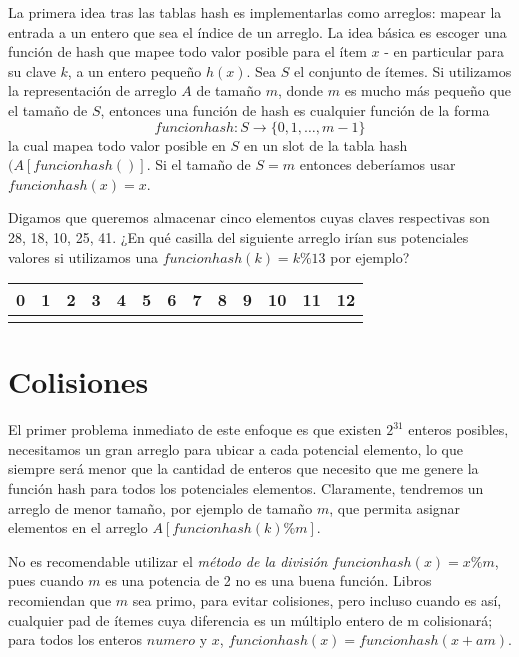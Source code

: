 La primera idea tras las tablas hash es implementarlas como arreglos: mapear la entrada a un entero que sea el índice de un arreglo. 
La idea básica es escoger una función de hash que mapee todo valor posible para el ítem $x$ - en particular para su clave $k$, a un entero pequeño $h(x)$. Sea $S$ el conjunto de ítemes. Si utilizamos la representación de arreglo $A$ de tamaño $m$, donde $m$ es mucho más pequeño que el tamaño de $S$, entonces una función de hash es cualquier función de la forma 
\begin{equation}
funcionhash: S \rightarrow \{0,1,\ldots, m-1\}
\end{equation}
la cual mapea todo valor posible en $S$ en un slot de la tabla hash $(A[funcionhash()]$. Si el tamaño de $S=m$ entonces deberíamos usar $funcionhash(x)=x$.


\begin{tcolorbox}[colback=gray!5!white,colframe=orange!60!gray,title=Ejercicio] 
Digamos que queremos almacenar cinco elementos cuyas claves respectivas son 28, 18, 10, 25, 41. ¿En qué casilla del siguiente arreglo irían sus potenciales valores si utilizamos una $funcionhash(k)=k  \% 13$ por ejemplo?
\begin{center}
\begin{tabular}{ |c | c | c |c | c | c|c | c | c|c | c | c|c| }
\hline 
0 & 1 & 2 & 3 & 4 & 5 & 6 & 7 & 8 & 9 & 10& 11&12 \\
\hline 
& & & & & & & & & & & & \\
\hline 
\end{tabular}
\end{center}
\end{tcolorbox}


\section{Colisiones}
El primer problema inmediato de este enfoque es que existen $2^31$ enteros posibles, necesitamos un gran arreglo para ubicar a cada potencial elemento, lo que siempre será menor que la cantidad de enteros que necesito que me genere la función hash para todos los potenciales elementos.
Claramente, tendremos un arreglo de menor tamaño, por ejemplo de tamaño $m$, que permita asignar elementos en el arreglo $A[funcionhash(k)\%m]$. 


\begin{tcolorbox}[colback=gray!5!white,colframe=orange!60!gray,title=Método de la división para seleccionar la función de hash] No es recomendable utilizar el \textit{método de la división}  $funcionhash(x)=x \% m$, pues cuando $m$ es una potencia de 2 no es una buena función. Libros recomiendan que $m$ sea primo, para evitar colisiones, pero incluso cuando es así, cualquier pad de ítemes cuya diferencia es un múltiplo entero de m colisionará; para todos los enteros $numero$ y $x$, $funcionhash(x)=funcionhash(x+am).$  
\end{tcolorbox}

